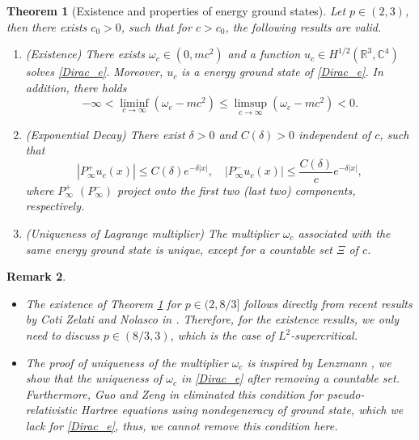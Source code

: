 \documentclass{amsart}
\theoremstyle{plain}
\newtheorem{theorem}{Theorem}[section]
\newtheorem{remark}[theorem]{Remark}
\theoremstyle{definition}
\theoremstyle{remark}
\numberwithin{equation}{section} \numberwithin{figure}{section}
\begin{document}
\begin{theorem}[Existence and properties of energy ground states]\label{them:1.1}
  \normalfont
  Let $ p\in (2,3) $, then there exists $c_0>0$, such that for $c>c_0$, the following results are valid.
  \begin{enumerate}
      \item (Existence) There exists $\omega_c\in (0,mc^2)$ and a function $ u_c\in  H^{1/2}(\mathbb{R}^3,\mathbb{C}^{4})$ solves \eqref{Dirac_e}. Moreover,
  $u_c$ is a energy ground state of  \eqref{Dirac_e}.
In addition, there holds
  $$-\infty < \liminf\limits_{c\to \infty} (\omega_c-mc^2)\leq \limsup\limits_{c\to \infty} (\omega_c-mc^2)< 0.$$
  \item (Exponential Decay)
 There exist $\delta>0$ and $C(\delta) >0$ independent of $c$,  such that
  $$
|P_\infty^+u_c(x)|\leq C(\delta)e^{-\delta|x|}, \quad
|P_\infty^-u_c(x)|\leq \frac{C(\delta)}{c}e^{-\delta|x|},
$$
where $P_\infty^{+}$ $(P_{\infty}^-)$  project onto the first two (last two) components, respectively.
\item (Uniqueness of Lagrange multiplier) The  multiplier $\omega_c$ associated with the same energy ground state is unique, except for a countable set $\Xi$ of $c$.
  \end{enumerate}
\end{theorem}
 
\begin{remark}
\begin{itemize}
    \item [(1)] The existence of Theorem \ref{them:1.1} for \( p \in (2, 8/3] \) follows directly from recent results by Coti Zelati and Nolasco in \cite{CN25}. Therefore, for the existence results, we only need to discuss \( p \in (8/3, 3) \), which is the case of $L^2$-supercritical.
    \item[(2)] The proof of uniqueness of the multiplier \( \omega_c \) 
    is inspired by Lenzmann \cite{MR2561169}, 
    we show that the uniqueness of \( \omega_c \) in \eqref{Dirac_e} after 
    removing a countable set. Furthermore, Guo and Zeng in \cite{GuoZeng20} eliminated this condition for pseudo-relativistic Hartree equations using nondegeneracy of ground state, which we lack for \eqref{Dirac_e}, thus, we cannot remove this condition here.
\end{itemize}
 
\end{remark}
\end{document}
